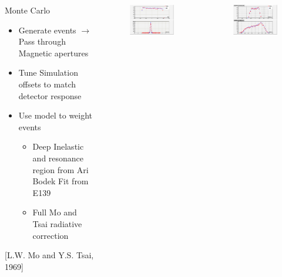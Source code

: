 \documentclass[12pt,usenames,dvipsnames]{beamer}
\begin{document}
\begin{frame}{}
\begin{columns}
	\begin{block}{Monte Carlo}
		\begin{itemize}
			\item Generate events $\rightarrow$ Pass through Magnetic apertures
			\item Tune Simulation offsets to match detector response
			\item Use model to weight events
			\begin{itemize}
				\item Deep Inelastic and resonance region from Ari Bodek Fit from E139 
				\item Full Mo and Tsai radiative correction
			\end{itemize}
		\end{itemize}
		\cite{bodek}  
		[L.W. Mo and Y.S. Tsai, 1969] 
	\end{block}
	\vspace{-20pt}
	\begin{figure}
		\includegraphics[width=6cm]{../images/dp_ytar_1207.png}
	\end{figure}
	\vspace{-30pt}
	\begin{figure}
		\includegraphics[width=6cm]{../images/xp_yp_foc_1207.png}
	\end{figure}
\end{columns}
\end{frame}
\end{document}
